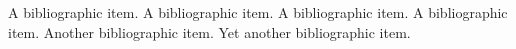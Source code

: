 \documentclass[12pt]{template/nuthesis}
\begin{document}

%

%


























%
\begin{singlespace}
\clearpage{} %
\begin{thebibliography}{xxx}

 A bibliographic item.  A bibliographic item.  A
bibliographic item.  A bibliographic item.
 Another bibliographic item.  
 Yet another bibliographic item.  
\end{thebibliography}
\end{singlespace}

% 


\appendix		%
\end{document}
